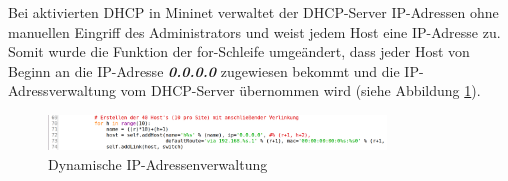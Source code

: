 \documentclass[fontsize=12pt,paper=a4,open=any,parskip=half,
  twoside=false,toc=listof,toc=bibliography,fleqn,leqno,
  captions=nooneline,captions=tableabove,british]{scrbook}
\begin{document}
Bei aktivierten DHCP in Mininet verwaltet der DHCP-Server IP-Adressen ohne manuellen Eingriff des Administrators und weist jedem Host eine IP-Adresse zu. Somit wurde die Funktion der for-Schleife umgeändert, dass jeder Host von Beginn an die IP-Adresse \textit{\textbf{0.0.0.0}} zugewiesen bekommt und die IP-Adressverwaltung vom DHCP-Server übernommen wird (siehe Abbildung \ref{forneu}).
  
\begin{figure}[H]
 \centering
 \includegraphics[width=0.8\textwidth]{Bilder/forneu}
 \captionsetup{justification=centering}
 \caption{Dynamische IP-Adressenverwaltung}
 \label{forneu}
\end{figure}
\end{document}
